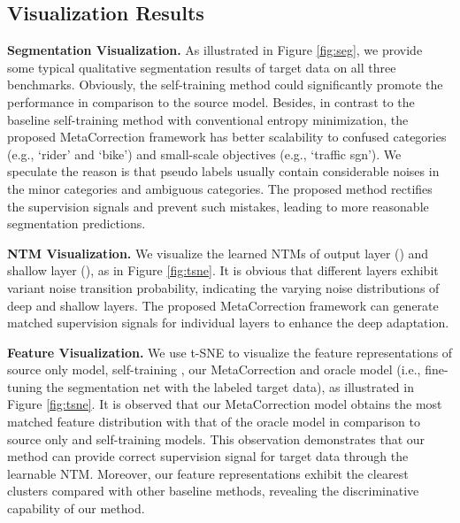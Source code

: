 \documentclass[final]{cvpr}
\begin{document}
\subsection{Visualization Results}
\vspace{-0.1cm}
\textbf{Segmentation Visualization.} 
As illustrated in Figure \ref{fig:seg}, we provide some typical qualitative segmentation results of target data on all three benchmarks. Obviously, the self-training method \cite{zou2019confidence} could significantly promote the performance in comparison to the source model. Besides, in contrast to the baseline self-training method with conventional entropy minimization, the proposed MetaCorrection framework has better scalability to confused categories (e.g., `rider' and `bike') and small-scale objectives (e.g., `traffic sgn'). We speculate the reason is that pseudo labels usually contain considerable noises in the minor categories and ambiguous categories. The proposed method rectifies the supervision signals and prevent such mistakes, leading to more reasonable segmentation predictions.

\textbf{NTM Visualization.} We visualize the learned NTMs of output layer () and shallow layer (), as in Figure \ref{fig:tsne}. It is obvious that different layers exhibit variant noise transition probability, indicating the varying noise distributions of deep and shallow layers. The proposed MetaCorrection framework can generate matched supervision signals for individual layers to enhance the deep adaptation. 


\textbf{Feature Visualization.} 
We use t-SNE \cite{maaten2008visualizing} to visualize the feature representations of source only model, self-training \cite{zou2019confidence}, our MetaCorrection and oracle model (i.e., fine-tuning the segmentation net with the labeled target data), as illustrated in Figure \ref{fig:tsne}. It is observed that our MetaCorrection model obtains the most matched feature distribution with that of the oracle model in comparison to source only and self-training \cite{zou2019confidence} models. This observation demonstrates that our method can provide correct supervision signal for target data through the learnable NTM. Moreover, our feature representations exhibit the clearest clusters compared with other baseline methods, revealing the discriminative capability of our method.

\vspace{-0.1cm}
\end{document}
